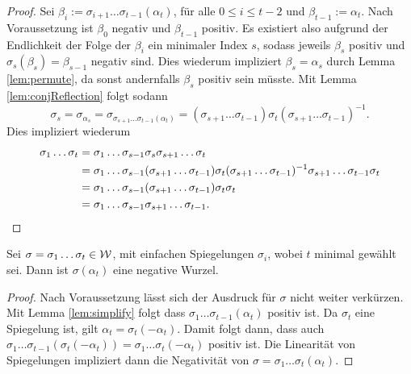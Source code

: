 \begin{proof}
  Sei $\beta_i := \sigma_{i + 1} \dots \sigma_{t-1}(\alpha_t)$, für alle $0 \leq i \leq t - 2$ und $\beta_{t - 1} := \alpha_t$.
  Nach Voraussetzung ist $\beta_0$ negativ und $\beta_{t - 1}$ positiv.
  Es existiert also aufgrund der Endlichkeit der Folge der $\beta_i$ ein minimaler Index $s$, sodass jeweils $\beta_s$ positiv und $\sigma_s(\beta_s) = \beta_{s - 1}$ negativ sind.
  Dies wiederum impliziert $\beta_s = \alpha_s$ durch Lemma \ref{lem:permute}, da sonst andernfalls $\beta_s$ positiv sein müsste.
  Mit Lemma \ref{lem:conjReflection} folgt sodann
  \begin{displaymath}
    \sigma_s 
    = \sigma_{\alpha_s} 
    = \sigma_{\sigma_{s+1} \dots \sigma_{t - 1}(\alpha_t)}
    = (\sigma_{s+1} \dots \sigma_{t - 1}) \sigma_{t} (\sigma_{s+1} \dots \sigma_{t - 1})^{-1}.
  \end{displaymath}
  Dies impliziert wiederum
  \begin{align*}
    \sigma_1 \dots \sigma_t 
    &= \sigma_1 \dots \sigma_{s - 1} \sigma_s \sigma_{s+1} \dots \sigma_t \\
    &= \sigma_1 \dots \sigma_{s - 1} (\sigma_{s+1} \dots \sigma_{t - 1}) \sigma_{t} (\sigma_{s+1} \dots \sigma_{t - 1})^{-1} \sigma_{s+1} \dots \sigma_{t - 1} \sigma_t\\
    &= \sigma_1 \dots \sigma_{s - 1} (\sigma_{s+1} \dots \sigma_{t - 1}) \sigma_t  \sigma_t\\
    &= \sigma_1 \dots \sigma_{s - 1} \sigma_{s+1} \dots \sigma_{t - 1}. \qedhere
  \end{align*}
\end{proof}

\begin{cor}
  \label{cor:minimalReflection}
  Sei $\sigma = \sigma_1 \dots \sigma_t \in \mathcal{W}$, mit einfachen Spiegelungen $\sigma_i$, wobei $t$ minimal gewählt sei. Dann ist $\sigma(\alpha_t)$ eine negative Wurzel.
\end{cor}

\begin{proof}
  Nach Voraussetzung lässt sich der Ausdruck für $\sigma$ nicht weiter verkürzen.
  Mit Lemma \ref{lem:simplify} folgt dass $\sigma_1 \dots \sigma_{t-1}(\alpha_t)$ positiv ist.
  Da $\sigma_t$ eine Spiegelung ist, gilt $\alpha_t = \sigma_t(-\alpha_t)$.
  Damit folgt dann, dass auch $\sigma_1 \dots \sigma_{t-1}(\sigma_t(-\alpha_t)) = \sigma_1 \dots \sigma_t(-\alpha_t)$ positiv ist.
  Die Linearität von Spiegelungen impliziert dann die Negativität von $\sigma = \sigma_1 \dots \sigma_t(\alpha_t)$.
\end{proof}

